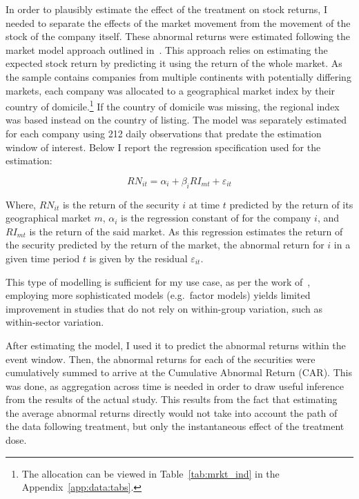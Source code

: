 \documentclass[12pt]{article}
\begin{document}

In order to plausibly estimate the effect of the treatment on stock returns, I needed to separate the effects of the market movement from the movement of the stock of the company itself. These abnormal returns were estimated following the market model approach outlined in~\textcite{mackinlayEventStudiesEconomics1997}. This approach relies on estimating the expected stock return by predicting it using the return of the whole market. As the sample contains companies from multiple continents with potentially differing markets, each company was allocated to a geographical market index by their country of domicile.\footnote{The allocation can be viewed in Table~\ref{tab:mrkt_ind} in the Appendix~\ref{app:data:tabs}.} If the country of domicile was missing, the regional index was based instead on the country of listing. The model was separately estimated for each company using 212 daily observations that predate the estimation window of interest. Below I report the regression specification used for the estimation:

\begin{equation}\label{eq:reg_market_model}
    RN_{it} = \alpha_i + \beta_{i} RI_{mt} + \varepsilon_{it}
\end{equation}

Where, $RN_{it}$ is the return of the security $i$ at time $t$ predicted by the return of its geographical market $m$, $\alpha_i$ is the regression constant of for the company $i$, and $RI_{mt}$ is the return of the said market. As this regression estimates the return of the security predicted by the return of the market, the abnormal return for $i$ in a given time period $t$ is given by the residual $\varepsilon_{it}$.

This type of modelling is sufficient for my use case, as per the work of~\textcite{mackinlayEventStudiesEconomics1997}, employing more sophisticated models (e.g.~factor models) yields limited improvement in studies that do not rely on within-group variation, such as within-sector variation.

After estimating the model, I used it to predict the abnormal returns within the event window. Then, the abnormal returns for each of the securities were cumulatively summed to arrive at the Cumulative Abnormal Return (CAR). This was done, as aggregation across time is needed in order to draw useful inference from the results of the actual study. This results from the fact that estimating the average abnormal returns directly would not take into account the path of the data following treatment, but only the instantaneous effect of the treatment dose. 
\end{document}
